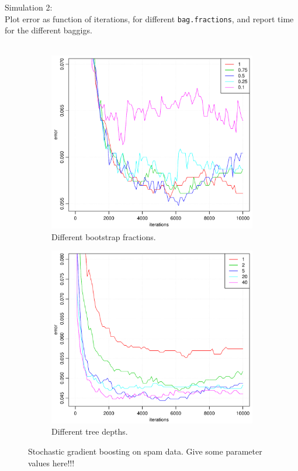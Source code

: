 Simulation 2:\\
Plot error as function of iterations, for different \verb+bag.fractions+, and report time for the different baggigs.\\
\\
\begin{figure}[h!]
  \centering
  \begin{subfigure}[b]{0.48\textwidth}
    \includegraphics[width=\textwidth]{./figures/gradboostSpamStoch.pdf}
    \caption{Different bootstrap fractions.}
    \label{fig:gradboostSpamStoch}
  \end{subfigure}%
  \quad
  \begin{subfigure}[b]{0.48\textwidth}
    \includegraphics[width=\textwidth]{./figures/gradboostSpamDepth.pdf}
    \caption{Different tree depths.}
    \label{fig:gradboostSpamDepth}
  \end{subfigure}
  \vspace{1\baselineskip}
  \caption{Stochastic gradient boosting on spam data. Give some parameter values here!!!}
  \label{fig:StochasticGradBoost}
\end{figure}
